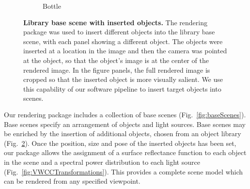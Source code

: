 \documentclass{jov}
\begin{document}
\begin{figure}
\begin{subfigure}[b]{0.14 \textwidth}
        \caption{Bottle}
        \label{fig:libraryWithChampagneBottle}
    \end{subfigure}
\caption{{\bf Library base scene with inserted objects.} The rendering package was used to insert different objects into the library base scene, with each panel showing a different object. The objects were inserted at a location in the image and then the camera was pointed at the object, so that the object's image is at the center of the rendered image.  In the figure panels, the full rendered image is cropped so that the inserted object is more visually salient. We use this capability of our software pipeline to insert target objects into scenes.}\label{fig:libraryWithTarget}
\end{figure}

Our rendering package includes a collection of base scenes (Fig.~\ref{fig:baseScenes}).
Base scenes specify an arrangement of objects and light sources.
Base scenes may be enriched by the insertion of additional objects, chosen from an object library (Fig.~\ref{fig:libraryWithTarget}).
Once the position, size and pose of the inserted objects has been set, our package allows the assignment of a surface reflectance function to each object in the scene and a spectral power distribution to each light source (Fig.~\ref{fig:VWCCTransformations}).
This provides a complete scene model which can be rendered from any specified viewpoint.
\end{document}

